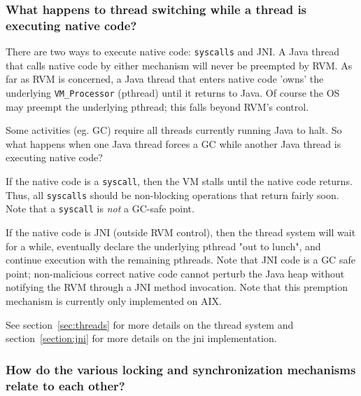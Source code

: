 \subsubsection{What happens to thread switching while a thread is
executing native code?}

There are two ways to execute native code: {\tt syscalls} and JNI.
A Java thread that calls native code by either mechanism will never
be preempted by RVM.  As far as RVM is concerned, a Java thread that
enters native code 'owns' the underlying {\tt VM\_Processor} (pthread)
until it returns to Java.  Of course the OS may preempt the underlying
pthread; this falls beyond RVM's control.

Some activities (eg. GC) require all threads currently running Java to halt.  
So what happens when one Java thread forces a GC while another Java thread is
executing native code?

If the native code is a {\tt syscall}, then the VM stalls until the native
code returns.  Thus, all {\tt syscalls} should be non-blocking
operations that return fairly soon.  Note that a {\tt syscall} is 
{\em not} a GC-safe point.

If the native code is JNI (outside RVM control), then the thread system
will wait for a while, eventually declare the underlying pthread "out to
lunch", and continue execution with the remaining pthreads.  Note that 
JNI code is a GC safe point; non-malicious correct native code cannot
perturb the Java heap without notifying the RVM through a JNI method
invocation.  Note that this premption mechanism is currently only
implemented on AIX.

See section~\ref{sec:threads} for more details on the thread system
and section~\ref{section:jni} for more details on the jni implementation.

\subsubsection{How do the various locking and synchronization mechanisms
relate to each other?}


